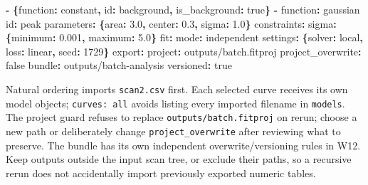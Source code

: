 \documentclass[
  10pt,
  a4paper,
  oneside]{scrreprt}
\newenvironment{Shaded}{}{}
\newcommand{\AttributeTok}[1]{\textcolor[rgb]{0.49,0.56,0.16}{#1}}
\newcommand{\CharTok}[1]{\textcolor[rgb]{0.25,0.44,0.63}{#1}}
\newcommand{\DecValTok}[1]{\textcolor[rgb]{0.25,0.63,0.44}{#1}}
\newcommand{\FloatTok}[1]{\textcolor[rgb]{0.25,0.63,0.44}{#1}}
\newcommand{\FunctionTok}[1]{\textcolor[rgb]{0.02,0.16,0.49}{#1}}
\newcommand{\KeywordTok}[1]{\textcolor[rgb]{0.00,0.44,0.13}{\textbf{#1}}}
\begin{document}
\begin{Shaded}
\begin{Highlighting}[]
\AttributeTok{      }\KeywordTok{{-}}\AttributeTok{ }\KeywordTok{\{}\FunctionTok{function}\KeywordTok{:}\AttributeTok{ constant}\KeywordTok{,}\AttributeTok{ }\FunctionTok{id}\KeywordTok{:}\AttributeTok{ background}\KeywordTok{,}\AttributeTok{ }\FunctionTok{is\_background}\KeywordTok{:}\AttributeTok{ }\CharTok{true}\KeywordTok{\}}
\AttributeTok{      }\KeywordTok{{-}}\AttributeTok{ }\FunctionTok{function}\KeywordTok{:}\AttributeTok{ gaussian}
\AttributeTok{        }\FunctionTok{id}\KeywordTok{:}\AttributeTok{ peak}
\AttributeTok{        }\FunctionTok{parameters}\KeywordTok{:}\AttributeTok{ }\KeywordTok{\{}\FunctionTok{area}\KeywordTok{:}\AttributeTok{ }\FloatTok{3.0}\KeywordTok{,}\AttributeTok{ }\FunctionTok{center}\KeywordTok{:}\AttributeTok{ }\FloatTok{0.3}\KeywordTok{,}\AttributeTok{ }\FunctionTok{sigma}\KeywordTok{:}\AttributeTok{ }\FloatTok{1.0}\KeywordTok{\}}
\AttributeTok{        }\FunctionTok{constraints}\KeywordTok{:}
\AttributeTok{          }\FunctionTok{sigma}\KeywordTok{:}\AttributeTok{ }\KeywordTok{\{}\FunctionTok{minimum}\KeywordTok{:}\AttributeTok{ }\FloatTok{0.001}\KeywordTok{,}\AttributeTok{ }\FunctionTok{maximum}\KeywordTok{:}\AttributeTok{ }\FloatTok{5.0}\KeywordTok{\}}
\FunctionTok{fit}\KeywordTok{:}
\AttributeTok{  }\FunctionTok{mode}\KeywordTok{:}\AttributeTok{ independent}
\AttributeTok{  }\FunctionTok{settings}\KeywordTok{:}\AttributeTok{ }\KeywordTok{\{}\FunctionTok{solver}\KeywordTok{:}\AttributeTok{ local}\KeywordTok{,}\AttributeTok{ }\FunctionTok{loss}\KeywordTok{:}\AttributeTok{ linear}\KeywordTok{,}\AttributeTok{ }\FunctionTok{seed}\KeywordTok{:}\AttributeTok{ }\DecValTok{1729}\KeywordTok{\}}
\FunctionTok{export}\KeywordTok{:}
\AttributeTok{  }\FunctionTok{project}\KeywordTok{:}\AttributeTok{ outputs/batch.fitproj}
\AttributeTok{  }\FunctionTok{project\_overwrite}\KeywordTok{:}\AttributeTok{ }\CharTok{false}
\AttributeTok{  }\FunctionTok{bundle}\KeywordTok{:}\AttributeTok{ outputs/batch{-}analysis}
\AttributeTok{  }\FunctionTok{versioned}\KeywordTok{:}\AttributeTok{ }\CharTok{true}
\end{Highlighting}
\end{Shaded}

Natural ordering imports \texttt{scan2.csv} first. Each selected curve
receives its own model objects; \texttt{curves:\ all} avoids listing
every imported filename in \texttt{models}. The project guard refuses to
replace \texttt{outputs/batch.fitproj} on rerun; choose a new path or
deliberately change \texttt{project\_overwrite} after reviewing what to
preserve. The bundle has its own independent overwrite/versioning rules
in W12. Keep outputs outside the input scan tree, or exclude their
paths, so a recursive rerun does not accidentally import previously
exported numeric tables.
\end{document}
